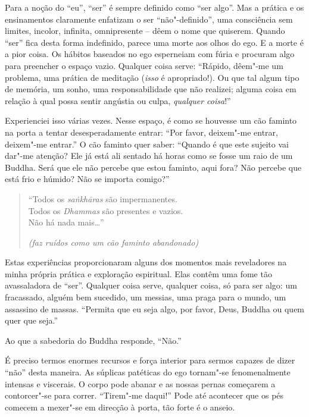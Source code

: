 Para a noção do ``eu'', ``ser'' é sempre definido como ``ser algo''. Mas
a prática e os ensinamentos claramente enfatizam o ser ``não"-definido'',
uma consciência sem limites, incolor, infinita, omnipresente -- dêem o
nome que quiserem. Quando ``ser'' fica desta forma indefinido, parece
uma morte aos olhos do ego. E a morte é a pior coisa. Os hábitos
baseados no ego esperneiam com fúria e procuram algo para preencher o
espaço vazio. Qualquer coisa serve: ``Rápido, dêem"-me um problema, uma
prática de meditação (\emph{isso} é apropriado!). Ou que tal algum tipo
de memória, um sonho, uma responsabilidade que não realizei; alguma
coisa em relação à qual possa sentir angústia ou culpa, \emph{qualquer
coisa}!''

Experienciei isso várias vezes. Nesse espaço, é como se houvesse um cão
faminto na porta a tentar desesperadamente entrar: ``Por favor,
deixem"-me entrar, deixem"-me entrar.'' O cão faminto quer saber: ``Quando
é que este sujeito vai dar"-me atenção? Ele já está ali sentado há horas
como se fosse um raio de um Buddha. Será que ele não percebe que estou
faminto, aqui fora? Não percebe que está frio e húmido? Não se importa
comigo?''

\begin{quote}
  ``Todos os \emph{saṅkhāras} são impermanentes.\\
  Todos os \emph{Dhammas} são presentes e vazios.\\
  Não há nada mais\ldots{}''

\emph{(faz ruídos como um cão faminto abandonado)}
\end{quote}

Estas experiências proporcionaram alguns dos momentos mais reveladores
na minha própria prática e exploração espiritual. Elas contêm uma fome
tão avassaladora de ``ser''. Qualquer coisa serve, qualquer coisa, só
para ser algo: um fracassado, alguém bem sucedido, um messias, uma praga
para o mundo, um assassino de massas. ``Permita que eu seja algo, por
favor, Deus, Buddha ou quem quer que seja.''

Ao que a sabedoria do Buddha responde, ``Não.''

É preciso termos enormes recursos e força interior para sermos capazes
de dizer ``não'' desta maneira. As súplicas patéticas do ego tornam"-se
fenomenalmente intensas e viscerais. O corpo pode abanar e as nossas
pernas começarem a contorcer"-se para correr. ``Tirem"-me daqui!'' Pode
até acontecer que os pés comecem a mexer"-se em direcção à porta, tão
forte é o anseio.


